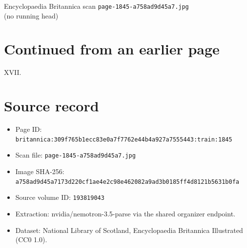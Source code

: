 \documentclass{article}
\begin{document}
\begin{center}
{\Large Encyclopaedia Britannica scan \texttt{page-1845-a758ad9d45a7.jpg}}\\[0.5em]
(no running head)
\end{center}
\section*{Continued from an earlier page}
XVII.

\section*{Source record}
\begin{itemize}
\item Page ID: \texttt{britannica:309f765b1ecc83e0a7f7762e44b4a927a7555443:train:1845}
\item Scan file: \texttt{page-1845-a758ad9d45a7.jpg}
\item Image SHA-256: \texttt{a758ad9d45a7173d220cf1ae4e2c98e462082a9ad3b0185ff4d8121b5631b0fa}
\item Source volume ID: \texttt{193819043}
\item Extraction: nvidia/nemotron-3.5-parse via the shared organizer endpoint.
\item Dataset: National Library of Scotland, Encyclopaedia Britannica Illustrated (CC0 1.0).
\end{itemize}
\end{document}
